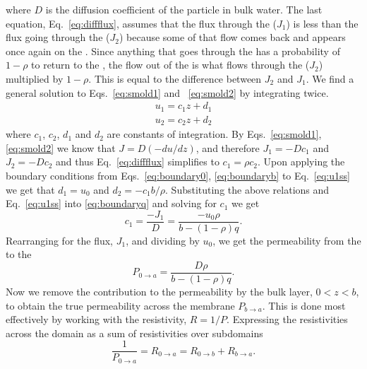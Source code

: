         where $D$ is the diffusion coefficient of the particle in bulk water. The last equation, Eq.~\ref{eq:diffflux}, assumes that the flux through the  ($J_1$) is less than the flux going through the  ($J_2$) because some of that flow comes back and appears once again on the . Since anything that goes through the  has a probability of $1-\rho$ to return to the , the flow out of the  is what flows through the  ($J_2$) multiplied by $1-\rho$. This is equal to the difference between $J_2$ and $J_1$. We find a general solution to Eqs.~\ref{eq:smold1} and ~\ref{eq:smold2} by integrating twice.
        \begin{subequations}\label{eq:u1ss}
            \begin{gather}
                u_1 = c_1z + d_1\\
                u_2 = c_2z + d_2
            \end{gather}
        \end{subequations}
        where $c_1$, $c_2$, $d_1$ and $d_2$ are constants of integration. By Eqs.~\ref{eq:smold1}, \ref{eq:smold2} we know that $J=D(-du/dz)$, and therefore $J_1 = -Dc_1$ and $J_2 = -Dc_2$ and thus Eq.~\ref{eq:diffflux} simplifies to $c_1 = \rho c_2$. Upon applying the boundary conditions from Eqs.~\ref{eq:boundary0}, \ref{eq:boundaryb} to Eq.~\ref{eq:u1ss} we get that $d_1 = u_0$ and $d_2 = -c_1b/\rho$. Substituting the above relations and Eq.~\ref{eq:u1ss} into \ref{eq:boundaryq} and solving for $c_1$ we get
        \begin{equation}
            c_1 = \frac{-J_1}{D} = \frac{- u_0\rho}{b - (1-\rho)q}.
        \end{equation}
        Rearranging for the flux, $J_1$, and dividing by $u_0$, we get the permeability from the  to the 
        \begin{equation}
            P_{0\rightarrow a} = \frac{D\rho}{b-(1-\rho)q}.
            \label{eq:p0toa}
        \end{equation}
        Now we remove the contribution to the permeability by the bulk layer, $0<z<b$, to obtain the true permeability across the membrane $P_{b\rightarrow a}$. This is done most effectively by working with the resistivity, $R=1/P$. Expressing the resistivities across the domain as a sum of resistivities over subdomains
        \begin{equation}
            \frac{1}{P_{0\rightarrow a}} = R_{0\rightarrow a} =  R_{0\rightarrow b} + R_{b\rightarrow a}.
            \label{eq:resistivitysum}
        \end{equation}

